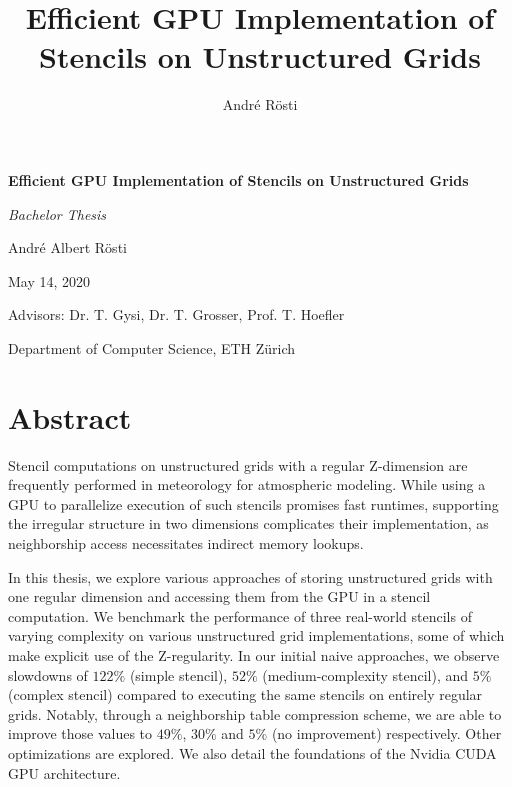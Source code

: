 \documentclass[a4paper, 11pt]{book}
\title{Efficient GPU Implementation of Stencils on Unstructured Grids}
\author{André Rösti}
\begin{document}
\begin{titlepage}
	\begin{center}
		\vspace*{2cm}
		{\Huge \textbf{Efficient GPU Implementation of Stencils on Unstructured Grids}}
		\vspace{2cm}
		
		{\Large \textit{Bachelor Thesis}}
		\vspace{2cm}
		
		André Albert Rösti
		
		May 14, 2020
	\end{center}
	\vfill
	\raggedleft Advisors: Dr. T. Gysi, Dr. T. Grosser, Prof. T. Hoefler
		
	\raggedleft Department of Computer Science, ETH Zürich
	\vspace*{2cm}
\end{titlepage}
\restoregeometry

\thispagestyle{empty}

\tableofcontents

\chapter*{Abstract}

Stencil computations on unstructured grids with a regular Z-dimension are frequently performed in meteorology for atmospheric modeling. While using a GPU to parallelize execution of such stencils promises fast runtimes, supporting the irregular structure in two dimensions complicates their implementation, as neighborship access necessitates indirect memory lookups.

In this thesis, we explore various approaches of storing unstructured grids with one regular dimension and accessing them from the GPU in a stencil computation. We benchmark the performance of three real-world stencils of varying complexity on various unstructured grid implementations, some of which make explicit use of the Z-regularity. In our initial naive approaches, we observe slowdowns of $122\%$ (simple stencil), $52\%$ (medium-complexity stencil), and $5\%$ (complex stencil) compared to executing the same stencils on entirely regular grids. Notably, through a neighborship table compression scheme, we are able to improve those values to $49\%$, $30\%$ and $5\%$ (no improvement) respectively. Other optimizations are explored. We also detail the foundations of the Nvidia CUDA GPU architecture.














\printbibliography
\end{document}
